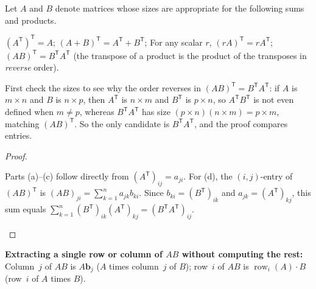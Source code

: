 \documentclass[10pt]{scrartcl}
\newcommand{\vv}[1]{\mathbf{#1}}
\begin{document}
\begin{theorem*}
  Let $A$ and $B$ denote matrices whose sizes are appropriate for the following sums and products.
  \begin{enumerate}[(a)]
    \ii $(A^{\mathsf T})^{\mathsf T} = A$;
    \ii $(A+B)^{\mathsf T} = A^{\mathsf T} + B^{\mathsf T}$;
    \ii For any scalar $r$, $(rA)^{\mathsf T} = rA^{\mathsf T}$;
    \ii $(AB)^{\mathsf T} = B^{\mathsf T}A^{\mathsf T}$ \quad (the transpose of a product is the product of the transposes in \emph{reverse} order).
  \end{enumerate}
\end{theorem*}
\begin{ideabox}
  First check the sizes to see why the order reverses in $(AB)^{\mathsf T}=B^{\mathsf T}A^{\mathsf T}$: if $A$ is $m\times n$ and $B$ is $n\times p$, then $A^{\mathsf T}$ is $n\times m$ and $B^{\mathsf T}$ is $p\times n$, so $A^{\mathsf T}B^{\mathsf T}$ is not even defined when $m\ne p$, whereas $B^{\mathsf T}A^{\mathsf T}$ has size $(p\times n)(n\times m)=p\times m$, matching $(AB)^{\mathsf T}$. So the only candidate is $B^{\mathsf T}A^{\mathsf T}$, and the proof compares entries.
\end{ideabox}
\begin{proof}
  \begin{steps}
    \ii Parts (a)--(c) follow directly from $(A^{\mathsf T})_{ij}=a_{ji}$.
    \ii For (d), the $(i,j)$-entry of $(AB)^{\mathsf T}$ is $(AB)_{ji}=\sum_{k=1}^n a_{jk}b_{ki}$. Since $b_{ki}=(B^{\mathsf T})_{ik}$ and $a_{jk}=(A^{\mathsf T})_{kj}$, this sum equals $\sum_{k=1}^n (B^{\mathsf T})_{ik}(A^{\mathsf T})_{kj}=(B^{\mathsf T}A^{\mathsf T})_{ij}$.
  \end{steps}
\end{proof}

\begin{shortcuts}
  \ii \textbf{Extracting a single row or column of $AB$ without computing the rest:} Column~$j$ of $AB$ is $A\vv b_j$ ($A$ times column~$j$ of $B$); row~$i$ of $AB$ is $\operatorname{row}_i(A)\cdot B$ (row~$i$ of $A$ times $B$).
\end{shortcuts}
\end{document}
